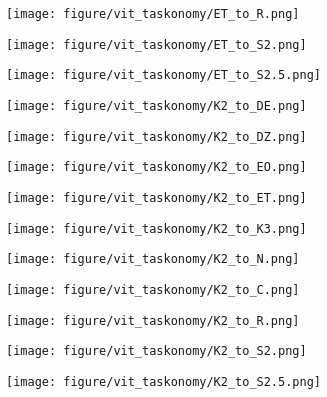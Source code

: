 \begin{figure}[h]
\begin{subfigure}{\figlength\textwidth}
\texttt{[image: figure/vit\_taskonomy/ET\_to\_R.png]}
\end{subfigure}
\begin{subfigure}{\figlength\textwidth}
\texttt{[image: figure/vit\_taskonomy/ET\_to\_S2.png]}
\end{subfigure}
\begin{subfigure}{\figlength\textwidth}
\texttt{[image: figure/vit\_taskonomy/ET\_to\_S2.5.png]}
\end{subfigure}
\begin{subfigure}{\figlength\textwidth}
\texttt{[image: figure/vit\_taskonomy/K2\_to\_DE.png]}
\end{subfigure}
\begin{subfigure}{\figlength\textwidth}
\texttt{[image: figure/vit\_taskonomy/K2\_to\_DZ.png]}
\end{subfigure}
\begin{subfigure}{\figlength\textwidth}
\texttt{[image: figure/vit\_taskonomy/K2\_to\_EO.png]}
\end{subfigure}
\begin{subfigure}{\figlength\textwidth}
\texttt{[image: figure/vit\_taskonomy/K2\_to\_ET.png]}
\end{subfigure}
\begin{subfigure}{\figlength\textwidth}
\texttt{[image: figure/vit\_taskonomy/K2\_to\_K3.png]}
\end{subfigure}
\begin{subfigure}{\figlength\textwidth}
\texttt{[image: figure/vit\_taskonomy/K2\_to\_N.png]}
\end{subfigure}
\begin{subfigure}{\figlength\textwidth}
\texttt{[image: figure/vit\_taskonomy/K2\_to\_C.png]}
\end{subfigure}
\begin{subfigure}{\figlength\textwidth}
\texttt{[image: figure/vit\_taskonomy/K2\_to\_R.png]}
\end{subfigure}
\begin{subfigure}{\figlength\textwidth}
\texttt{[image: figure/vit\_taskonomy/K2\_to\_S2.png]}
\end{subfigure}
\begin{subfigure}{\figlength\textwidth}
\texttt{[image: figure/vit\_taskonomy/K2\_to\_S2.5.png]}

\end{subfigure}
\end{figure}
